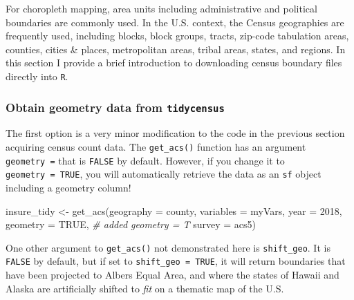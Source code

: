 \documentclass[
]{book}
\newenvironment{Shaded}{\begin{snugshade}}{\end{snugshade}}
\newcommand{\AttributeTok}[1]{\textcolor[rgb]{0.77,0.63,0.00}{#1}}
\newcommand{\CommentTok}[1]{\textcolor[rgb]{0.56,0.35,0.01}{\textit{#1}}}
\newcommand{\ConstantTok}[1]{\textcolor[rgb]{0.00,0.00,0.00}{#1}}
\newcommand{\DecValTok}[1]{\textcolor[rgb]{0.00,0.00,0.81}{#1}}
\newcommand{\FunctionTok}[1]{\textcolor[rgb]{0.00,0.00,0.00}{#1}}
\newcommand{\NormalTok}[1]{#1}
\newcommand{\OtherTok}[1]{\textcolor[rgb]{0.56,0.35,0.01}{#1}}
\newcommand{\StringTok}[1]{\textcolor[rgb]{0.31,0.60,0.02}{#1}}
\newenvironment{rmdtip}[1]
  {
  \begin{itemize}
  \renewcommand{\labelitemi}{
    \raisebox{-.7\height}[0pt][0pt]{
      {\setkeys{Gin}{width=3em,keepaspectratio}\texttt{[image: images/\#1]}}
    }
  }
  \setlength{\fboxsep}{1em}
  \begin{tip}
  \item
  }
  {
  \end{tip}
  \end{itemize}
  }
\begin{document}
For choropleth mapping, area units including administrative and political boundaries are commonly used. In the U.S. context, the Census geographies are frequently used, including blocks, block groups, tracts, zip-code tabulation areas, counties, cities \& places, metropolitan areas, tribal areas, states, and regions. In this section I provide a brief introduction to downloading census boundary files directly into \texttt{R}.

\hypertarget{obtain-geometry-data-from-tidycensus}{%
\subsubsection{\texorpdfstring{Obtain geometry data from \texttt{tidycensus}}{Obtain geometry data from tidycensus}}\label{obtain-geometry-data-from-tidycensus}}

The first option is a very minor modification to the code in the previous section acquiring census count data. The \texttt{get\_acs()} function has an argument \texttt{geometry\ =} that is \texttt{FALSE} by default. However, if you change it to \texttt{geometry\ =\ TRUE}, you will automatically retrieve the data as an \texttt{sf} object including a geometry column!

\begin{Shaded}
\begin{Highlighting}[]
\NormalTok{insure\_tidy }\OtherTok{\textless{}{-}} \FunctionTok{get\_acs}\NormalTok{(}\AttributeTok{geography =} \StringTok{\textquotesingle{}county\textquotesingle{}}\NormalTok{,}
                     \AttributeTok{variables =}\NormalTok{ myVars,}
                     \AttributeTok{year =} \DecValTok{2018}\NormalTok{, }
                     \AttributeTok{geometry =} \ConstantTok{TRUE}\NormalTok{,   }\CommentTok{\# added geometry = T}
                     \AttributeTok{survey =} \StringTok{\textquotesingle{}acs5\textquotesingle{}}\NormalTok{) }
\end{Highlighting}
\end{Shaded}

\begin{rmdtip}{tip}
One other argument to \texttt{get\_acs()} not demonstrated here is \texttt{shift\_geo}. It is \texttt{FALSE} by default, but if set to \texttt{shift\_geo\ =\ TRUE}, it will return boundaries that have been projected to Albers Equal Area, and where the states of Hawaii and Alaska are artificially shifted to \emph{fit} on a thematic map of the U.S.

\end{rmdtip}
\end{document}
